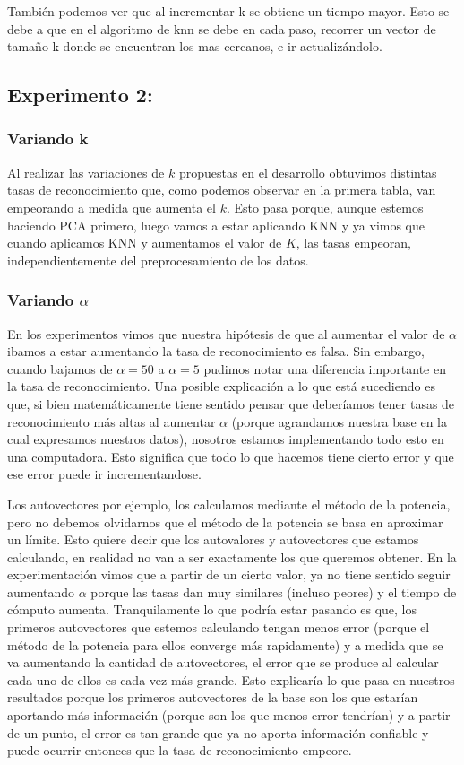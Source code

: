 También podemos ver que al incrementar k se obtiene un tiempo mayor. Esto se debe a que en el algoritmo de knn se debe en cada paso, recorrer un vector de tamaño k donde se encuentran los mas cercanos, e ir actualizándolo. 



 \subsection{Experimento 2:}
\subsubsection{Variando k}
Al realizar las variaciones de $k$ propuestas en el desarrollo obtuvimos distintas tasas de reconocimiento que, como podemos observar en la primera tabla, van empeorando a medida que aumenta el $k$. Esto pasa porque, aunque estemos haciendo PCA primero, luego vamos a estar aplicando KNN y ya vimos que cuando aplicamos KNN y aumentamos el valor de $K$, las tasas empeoran, independientemente del preprocesamiento de los datos.
\subsubsection{Variando $\alpha$}
En los experimentos vimos que nuestra hipótesis de que al aumentar el valor de $\alpha$ ibamos a estar aumentando la tasa de reconocimiento es falsa. Sin embargo, cuando bajamos de $\alpha = 50$ a $\alpha = 5$ pudimos notar una diferencia importante en la tasa de reconocimiento. Una posible explicación a lo que está sucediendo es que, si bien matemáticamente tiene sentido pensar que deberíamos tener tasas de reconocimiento más altas al aumentar $\alpha$ (porque agrandamos nuestra base en la cual expresamos nuestros datos), nosotros estamos implementando todo esto en una computadora. Esto significa que todo lo que hacemos tiene cierto error y que ese error puede ir incrementandose. 
\par Los autovectores por ejemplo, los calculamos mediante el método de la potencia, pero no debemos olvidarnos que el método de la potencia se basa en aproximar un límite. Esto quiere decir que los autovalores y autovectores que estamos calculando, en realidad no van a ser exactamente los que queremos obtener. En la experimentación vimos que a partir de un cierto valor, ya no tiene sentido seguir aumentando $\alpha$ porque las tasas dan muy similares (incluso peores) y el tiempo de cómputo aumenta. Tranquilamente lo que podría estar pasando es que, los primeros autovectores que estemos calculando tengan menos error (porque el método de la potencia para ellos converge más rapidamente) y a medida que se va aumentando la cantidad de autovectores, el error que se produce al calcular cada uno de ellos es cada vez más grande. Esto explicaría lo que pasa en nuestros resultados porque los primeros autovectores de la base son los que estarían aportando más información (porque son los que menos error tendrían) y a partir de un punto, el error es tan grande que ya no aporta información confiable y puede ocurrir entonces que la tasa de reconocimiento empeore.



